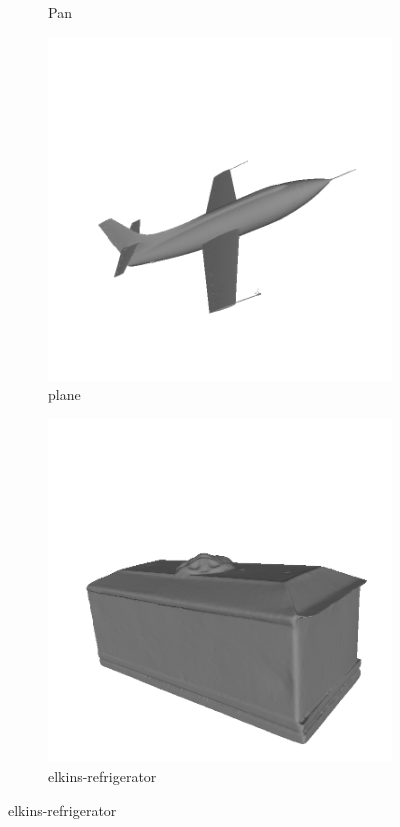\begin{figure}
\begin{subfigure}[b]{0.23\linewidth}
		\caption{Pan}
	\end{subfigure}
	\begin{subfigure}[b]{0.23\linewidth}
		\includegraphics[width=\linewidth]{./Figures/train-dataset/34.plane.png}
		\caption{plane}
	\end{subfigure}
	\begin{subfigure}[b]{0.23\linewidth}
		\includegraphics[width=\linewidth]{./Figures/train-dataset/35.elkins-refrigerator.png}
		\caption{elkins-refrigerator}
	\end{subfigure}
	

\end{figure}
